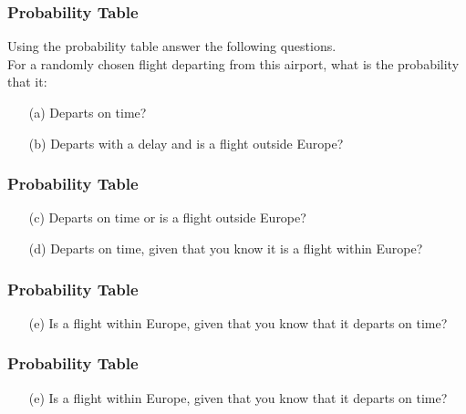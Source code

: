 \documentclass{beamer}
\begin{document}
 

\begin{frame}
\frametitle{Probability Table}
\vspace{-1cm}
\Large
Using the probability table answer the following questions. \\
\bigskip
For a randomly chosen flight departing from this airport, what is the probability that it: 
\begin{itemize}
\item[(a)] Departs on time? 
\item[(b)] Departs with a delay and is a flight outside Europe? 

\end{itemize}
\end{frame}
\begin{frame}
\frametitle{Probability Table}
\Large
\vspace{-2cm}
\begin{itemize}
\item[(c)] Departs on time or is a flight outside Europe? 
\item[(d)] Departs on time, given that you know it is a flight within Europe? 
\end{itemize}
\end{frame}
\begin{frame}
\frametitle{Probability Table}
\Large
\vspace{-2cm}
\begin{itemize}
\item[(e)] Is a flight within Europe, given that you know that it departs on time?
\end{itemize}
\end{frame}
\begin{frame}
\frametitle{Probability Table}
\Large
\vspace{-2cm}
\begin{itemize}
\item[(e)] Is a flight within Europe, given that you know that it departs on time?
\end{itemize}
\end{frame}
\end{document}
